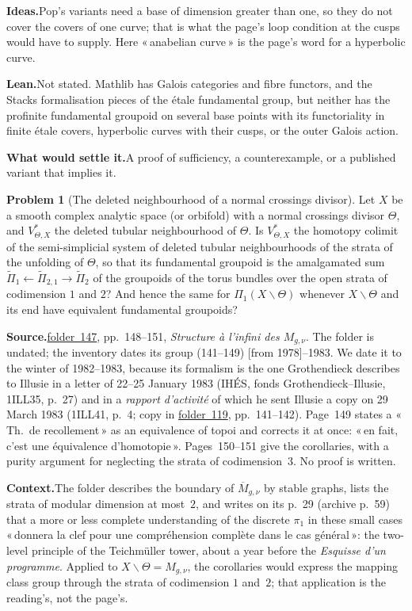\documentclass[11pt]{article}
\newcommand{\q}[1]{«\,#1\,»}
\newcommand{\fac}[1]{\href{https://grothendieck.umontpellier.fr/#1.pdf}{folder~#1}}
\theoremstyle{definition}
\newtheorem{problem}{Problem}
\theoremstyle{plain}\newtheorem*{proposition}{Proposition}\theoremstyle{definition}
\newcommand{\entry}[1]{\par\medskip\noindent\textbf{#1}\enspace}
\newcommand{\src}[1]{\entry{Source.}#1}
\newcommand{\ctx}{\entry{Context.}}
\newcommand{\ideas}{\entry{Ideas.}}
\newcommand{\leanst}{\entry{Lean.}}
\newcommand{\settle}{\entry{What would settle it.}}
\begin{document}
\ideas Pop's variants need a base of dimension greater than one, so they do not cover the covers of one curve; that is what the page's loop condition at the cusps would have to supply. Here \q{anabelian curve} is the page's word for a hyperbolic curve.

\leanst Not stated. Mathlib has Galois categories and fibre functors, and the Stacks formalisation \cite{axiomstacks} pieces of the étale fundamental group, but neither has the profinite fundamental groupoid on several base points with its functoriality in finite étale covers, hyperbolic curves with their cusps, or the outer Galois action.

\settle A proof of sufficiency, a counterexample, or a published variant that implies it.

\begin{problem}[The deleted neighbourhood of a normal crossings divisor]\label{p:nc}
Let $X$ be a smooth complex analytic space (or orbifold) with a normal crossings divisor $\Theta$, and $V^*_{\Theta,X}$ the deleted tubular neighbourhood of $\Theta$. Is $V^*_{\Theta,X}$ the homotopy colimit of the semi-simplicial system of deleted tubular neighbourhoods of the strata of the unfolding of $\Theta$, so that its fundamental groupoid is the amalgamated sum $\tilde\Pi_1 \leftarrow \tilde\Pi_{2,1} \rightarrow \tilde\Pi_2$ of the groupoids of the torus bundles over the open strata of codimension $1$ and $2$? And hence the same for $\Pi_1(X \smallsetminus \Theta)$ whenever $X \smallsetminus \Theta$ and its end have equivalent fundamental groupoids?
\end{problem}

\src{\fac{147}, pp.~148--151, \emph{Structure à l'infini des $M_{g,\nu}$}. The folder is undated; the inventory dates its group (141--149) [from 1978]--1983. We date it to the winter of 1982--1983, because its formalism is the one Grothendieck describes to Illusie in a letter of 22--25 January 1983 (IHÉS, fonds Grothendieck--Illusie, 1ILL35, p.~27) and in a \emph{rapport d'activité} of which he sent Illusie a copy on 29 March 1983 (1ILL41, p.~4; copy in \fac{119}, pp.~141--142). Page~149 states a \q{Th.\ de recollement} as an equivalence of topoi and corrects it at once: \q{en fait, c'est une équivalence d'homotopie}. Pages~150--151 give the corollaries, with a purity argument for neglecting the strata of codimension~$3$. No proof is written.}

\ctx The folder describes the boundary of $\overline M_{g,\nu}$ by stable graphs, lists the strata of modular dimension at most~$2$, and writes on its p.~29 (archive p.~59) that a more or less complete understanding of the discrete $\pi_1$ in these small cases \q{donnera la clef pour une compréhension complète dans le cas général}: the two-level principle of the Teichmüller tower, about a year before the \emph{Esquisse d'un programme}. Applied to $X \smallsetminus \Theta = M_{g,\nu}$, the corollaries would express the mapping class group through the strata of codimension $1$ and~$2$; that application is the reading's, not the page's.
\end{document}
